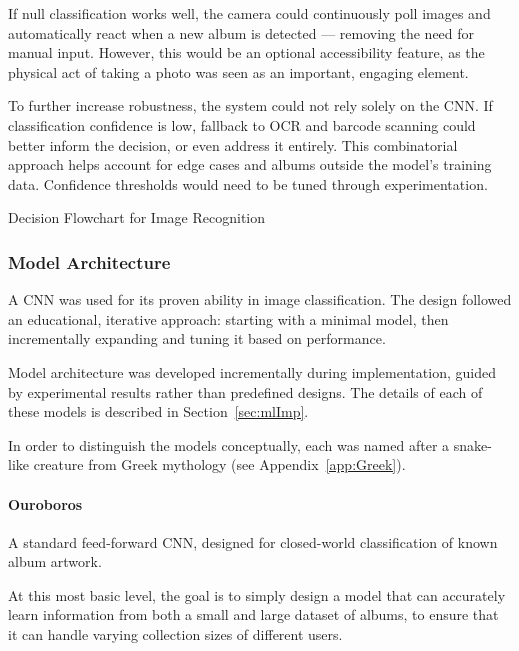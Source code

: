                 If null classification works well, the camera could continuously poll images and automatically react when a new album is detected — removing the need for manual input. However, this would be an optional accessibility feature, as the physical act of taking a photo was seen as an important, engaging element.
    
                To further increase robustness, the system could not rely solely on the CNN. If classification confidence is low, fallback to OCR and barcode scanning could better inform the decision, or even address it entirely. This combinatorial approach helps account for edge cases and albums outside the model's training data. Confidence thresholds would need to be tuned through experimentation.
    
                \begin{temp}
                    Decision Flowchart for Image Recognition
                \end{temp}
        
            \subsubsection{Model Architecture}
    
                A CNN was used for its proven ability in image classification. The design followed an educational, iterative approach: starting with a minimal model, then incrementally expanding and tuning it based on performance.
                
                Model architecture was developed incrementally during implementation, guided by experimental results rather than predefined designs. The details of each of these models is described in Section~\ref{sec:mlImp}.
    
                In order to distinguish the models conceptually, each was named after a snake-like creature from Greek mythology (see Appendix~\ref{app:Greek}).
    
                \paragraph{Ouroboros} A standard feed-forward CNN, designed for closed-world classification of known album artwork.
    
                At this most basic level, the goal is to simply design a model that can accurately learn information from both a small and large dataset of albums, to ensure that it can handle varying collection sizes of different users.
    
